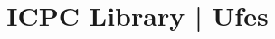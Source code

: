 \documentclass[10pt]{article}
\title{\vspace{-4ex}\Large{ICPC Library | Ufes    }}
\author{}
\date{}
\begin{document}
\begin{landscape}
\begin{multicols}{2}

\maketitle
\vspace{-13ex}
\tableofcontents
\pagestyle{fancy}



\end{multicols}
\end{landscape}
\end{document}
